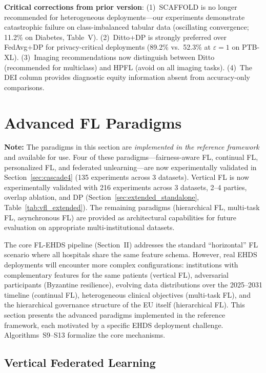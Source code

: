\documentclass[conference]{IEEEtran}
\begin{document}
\textbf{Critical corrections from prior version}: (1)~SCAFFOLD is no longer recommended for heterogeneous deployments---our experiments demonstrate catastrophic failure on class-imbalanced tabular data (oscillating convergence; 11.2\% on Diabetes, Table~V). (2)~Ditto+DP is strongly preferred over FedAvg+DP for privacy-critical deployments (89.2\% vs.\ 52.3\% at $\varepsilon{=}1$ on PTB-XL). (3)~Imaging recommendations now distinguish between Ditto (recommended for multiclass) and HPFL (avoid on all imaging tasks). (4)~The DEI column provides diagnostic equity information absent from accuracy-only comparisons.

\section{Advanced FL Paradigms}
\label{sec:advanced}

\textbf{Note:} The paradigms in this section are \textit{implemented in the reference framework} and available for use. Four of these paradigms---fairness-aware FL, continual FL, personalized FL, and federated unlearning---are now experimentally validated in Section~\ref{sec:cascade4} (135 experiments across 3 datasets). Vertical FL is now experimentally validated with 216 experiments across 3 datasets, 2--4 parties, overlap ablation, and DP (Section~\ref{sec:extended_standalone}, Table~\ref{tab:vfl_extended}). The remaining paradigms (hierarchical FL, multi-task FL, asynchronous FL) are provided as architectural capabilities for future evaluation on appropriate multi-institutional datasets.

The core FL-EHDS pipeline (Section~II) addresses the standard ``horizontal'' FL scenario where all hospitals share the same feature schema. However, real EHDS deployments will encounter more complex configurations: institutions with complementary features for the same patients (vertical FL), adversarial participants (Byzantine resilience), evolving data distributions over the 2025--2031 timeline (continual FL), heterogeneous clinical objectives (multi-task FL), and the hierarchical governance structure of the EU itself (hierarchical FL). This section presents the advanced paradigms implemented in the reference framework, each motivated by a specific EHDS deployment challenge. Algorithms~S9--S13 formalize the core mechanisms.

\subsection{Vertical Federated Learning}
\end{document}
